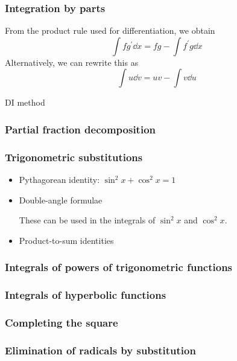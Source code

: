 \subsubsection{Integration by parts}
From the product rule used for differentiation, we obtain
\begin{equation}
\int f g^\prime \dd{x} = fg - \int f^\prime g \dd{x}
\end{equation}
Alternatively, we can rewrite this as 
\begin{equation}
\int u \dd{v} = uv - \int v \dd{u}
\end{equation}

DI method

\subsubsection{Partial fraction decomposition}

\subsubsection{Trigonometric substitutions}
\begin{itemize}
\item Pythagorean identity: $\sin^2x + \cos^2x = 1$

\item Double-angle formulae

These can be used in the integrals of $\sin^2x$ and $\cos^2x$.

\item Product-to-sum identities
\end{itemize}

\subsubsection{Integrals of powers of trigonometric functions}

\subsubsection{Integrals of hyperbolic functions}

\subsubsection{Completing the square}

\subsubsection{Elimination of radicals by substitution}

